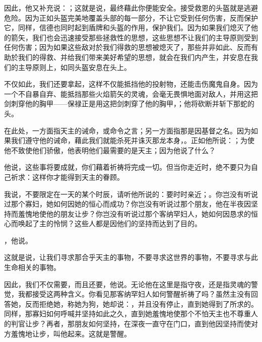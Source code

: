 因此，他又补充说：；这就是说，最终藉此你便能安全。接受救恩的头盔就是逃避危险。因为正如头盔完美地覆盖头部的每一部分，不让它受到任何伤害，反而保护它，同样，信德也同时起到盾牌和头盔的作用，保护我们。因为如果我们熄灭了他的箭矢，我们也会迅速接受那些拯救性的思想，这些思想不让我们的主导原则受到任何伤害；因为如果这些敌对於我们得救的思想被熄灭了，那些并非如此、反而有助於我们的得救、并给我们带来美好希望的思想，就会在我们内产生，并安息在我们的主导原则上，如同头盔安息在头上。\par

不仅如此，我们还要拿起，这样不仅能抵挡他的投射物，还能击伤魔鬼自身。因为一个不自暴自弃、能抵挡那些火焰箭矢的灵魂，会毫无畏惧地面对敌人，并用这把剑刺穿他的胸甲——保禄正是用这把剑刺穿了他的胸甲，；他将砍断并斩下那蛇的头。\par

\par

在此处，一方面指天主的诫命，或命令之言；另一方面指那是因基督之名。因为如果我们遵守他的诫命，藉此我们就能杀死并诛灭那龙本身，。正如他所说：；为使他不致使他们骄傲，他表明他们最需要的是天主；因为他说了什么？\par

他说，这些事将要成就，你们藉着祈祷将完成一切。但当你走近时，绝不要只为自己祈求：这样你才能得到天主的眷顾。\par

我说，不要限定在一天的某个时辰，请听他所说的：要时时亲近；。你岂没有听说过那个寡妇，她如何因她的恒心而成功？你岂没有听说过那个朋友，他在半夜因坚持而羞愧地使他的朋友让步？你岂没有听说过那个客纳罕妇人，她如何因恳求的恒心而唤起了主的怜悯？这些人都是因他们的坚持而达到了目的。\par

，他说。\par

这就是说，让我们寻求那合乎天主的事物，不要寻求这世界的事物，不要寻求与此生命相关的事物。\par

因此，我们不仅需要，而且还要，他说。无论他在这里是指守夜，还是指灵魂的警觉，我都接受这两种含义。你看见那客纳罕妇人如何警醒祈祷了吗？虽然主没有回答她，反而拒绝她，称她为狗，她却说：，并且没有停止，直到她得到了所求的。同样，那寡妇如何呼喊并坚持如此之久，直到她羞愧地使那个不怕天主也不尊重人的判官让步？再者，那朋友如何坚持，在深夜一直守在门口，直到他因坚持而使对方羞愧地让步，叫他起来。这就是警醒。\par

